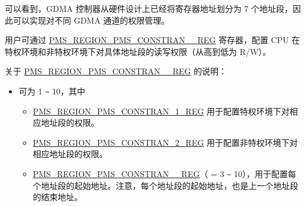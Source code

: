 \documentclass[main\_\_CN.tex]{subfiles}
\begin{document}
可以看到，GDMA 控制器从硬件设计上已经将寄存器地址划分为 7 个地址段，因此可以实现对不同 GDMA 通道的权限管理。

用户可通过 \hyperref[regdesc:PMSREGIONPMSCONSTRAIN1REG]{PMS\_REGION\_PMS\_CONSTRAN\_\_REG} 寄存器，配置 CPU 在特权环境和非特权环境下对具体地址段的读写权限（从高到低为 R/W）。

关于 \hyperref[regdesc:PMSREGIONPMSCONSTRAIN1REG]{PMS\_REGION\_PMS\_CONSTRAN\_\_REG} 的说明：
\begin{itemize}
    \item {} 可为 1 \verb+~+ 10，其中
    \begin{itemize}
        \item \hyperref[regdesc:PMSREGIONPMSCONSTRAIN1REG]{PMS\_REGION\_PMS\_CONSTRAN\_1\_REG} 用于配置特权环境下对相应地址段的权限。
        \item \hyperref[regdesc:PMSREGIONPMSCONSTRAIN2REG]{PMS\_REGION\_PMS\_CONSTRAN\_2\_REG} 用于配置非特权环境下对相应地址段的权限。
        \item \hyperref[regdesc:PMSREGIONPMSCONSTRAIN3REG]{PMS\_REGION\_PMS\_CONSTRAN\_\_REG}（ = 3 \verb+~+ 10），用于配置每个地址段的起始地址。注意，每个地址段的起始地址，也是上一个地址段的结束地址。
    \end{itemize}
\end{itemize}
\end{document}
